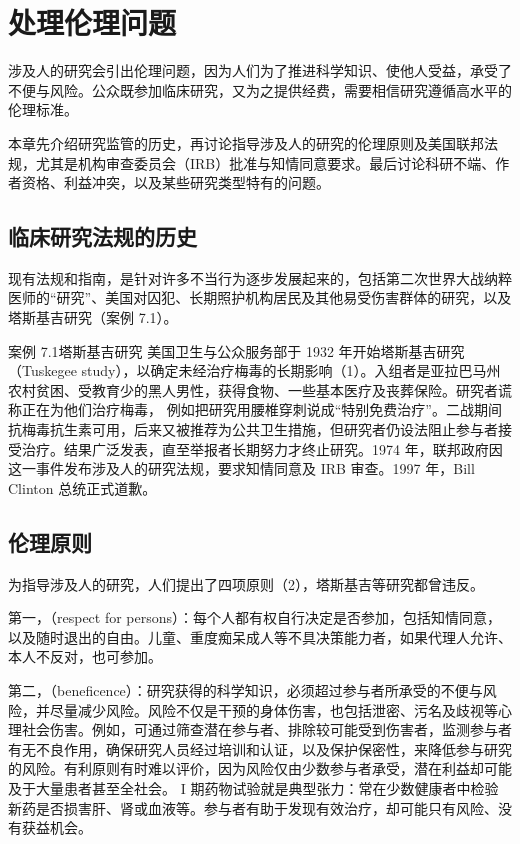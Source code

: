 \chapter{处理伦理问题}
涉及人的研究会引出伦理问题，因为人们为了推进科学知识、使他人受益，承受了不便与风险。公众既参加临床研究，又为之提供经费，需要相信研究遵循高水平的伦理标准。

本章先介绍研究监管的历史，再讨论指导涉及人的研究的伦理原则及美国联邦法规，尤其是机构审查委员会（IRB）批准与知情同意要求。最后讨论科研不端、作者资格、利益冲突，以及某些研究类型特有的问题。

\section{临床研究法规的历史}
现有法规和指南，是针对许多不当行为逐步发展起来的，包括第二次世界大战纳粹医师的“研究”、美国对囚犯、长期照护机构居民及其他易受伤害群体的研究，以及塔斯基吉研究（案例 7.1）。
\begin{bookbox}{案例 7.1\quad 塔斯基吉研究}
美国卫生与公众服务部于 1932 年开始塔斯基吉研究（Tuskegee study），以确定未经治疗梅毒的长期影响（1）。入组者是亚拉巴马州农村贫困、受教育少的黑人男性，获得食物、一些基本医疗及丧葬保险。研究者谎称正在为他们治疗梅毒，
例如把研究用腰椎穿刺说成“特别免费治疗”。二战期间抗梅毒抗生素可用，后来又被推荐为公共卫生措施，但研究者仍设法阻止参与者接受治疗。结果广泛发表，直至举报者长期努力才终止研究。1974 年，联邦政府因这一事件发布涉及人的研究法规，要求知情同意及 IRB 审查。1997 年，Bill Clinton 总统正式道歉。
\end{bookbox}

\section{伦理原则}
为指导涉及人的研究，人们提出了四项原则（2），塔斯基吉等研究都曾违反。

第一，（respect for persons）：每个人都有权自行决定是否参加，包括知情同意，以及随时退出的自由。儿童、重度痴呆成人等不具决策能力者，如果代理人允许、本人不反对，也可参加。

第二，（beneficence）：研究获得的科学知识，必须超过参与者所承受的不便与风险，并尽量减少风险。风险不仅是干预的身体伤害，也包括泄密、污名及歧视等心理社会伤害。例如，可通过筛查潜在参与者、排除较可能受到伤害者，监测参与者有无不良作用，确保研究人员经过培训和认证，以及保护保密性，来降低参与研究的风险。有利原则有时难以评价，因为风险仅由少数参与者承受，潜在利益却可能及于大量患者甚至全社会。
I 期药物试验就是典型张力：常在少数健康者中检验新药是否损害肝、肾或血液等。参与者有助于发现有效治疗，却可能只有风险、没有获益机会。

